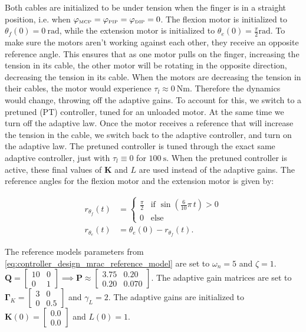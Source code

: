Both cables are initialized to be under tension when the finger is in a straight position, i.e. when $\varphi_{{\scriptscriptstyle\mathrm{MCP}}} = \varphi_{{\scriptscriptstyle\mathrm{PIP}}} = \varphi_{{\scriptscriptstyle\mathrm{DIP}}} = 0$. The flexion motor is initialized to $\theta_f(0) = \SI{0}{\radian}$, while the extension motor is initialized to $\theta_e(0) = \frac{\pi}{2}\si{\radian}$. To make sure the motors aren't working against each other, they receive an opposite reference angle. This ensures that as one motor pulls on the finger, increasing the tension in its cable, the other motor will be rotating in the opposite direction, decreasing the tension in its cable. When the motors are decreasing the tension in their cables, the motor would experience $\tau_l \approx \SI{0}{\newton\metre}$. Therefore the dynamics would change, throwing off the adaptive gains. To account for this, we switch to a pretuned (PT) controller, tuned for an unloaded motor. At the same time we turn off the adaptive law. Once the motor receives a reference that will increase the tension in the cable, we switch back to the adaptive controller, and turn on the adaptive law. The pretuned controller is tuned through the exact same adaptive controller, just with $\tau_l\equiv0$ for $\SI{100}{\second}$. When the pretuned controller is active, these final values of $\mathbf{K}$ and $L$ are used instead of the adaptive gains. The reference angles for the flexion motor and the extension motor is given by:

\begin{equation}
    \begin{aligned}
        r_{\theta_f}(t) &= \begin{cases}
            \frac{\pi}{2} & \text{if } \sin(\frac{6}{10}\pi\, t) > 0 \\
            0 & \text{else}
        \end{cases} \\
        r_{\theta_e}(t) &= \theta_e(0) - r_{\theta_f}(t).
    \end{aligned}
\end{equation}

The reference models parameters from \cref{eq:controller_design_mrac_reference_model} are set to $\omega_n = 5$ and $\zeta = 1$. $\mathbf{Q} = \begin{bmatrix}
    10 & 0 \\
    0 & 1
\end{bmatrix} \implies \mathbf{P} \approx \begin{bmatrix}
    3.75 & 0.20 \\
    0.20 & 0.070
\end{bmatrix}$. The adaptive gain matrices are set to $\boldsymbol{\Gamma}_K = \begin{bmatrix}
    3 & 0 \\
    0 & 0.5
\end{bmatrix}$ and $\gamma_L = 2$. The adaptive gains are initialized to $\mathbf{K}(0) = \begin{bmatrix}
    0.0 \\
    0.0
\end{bmatrix}$ and $L(0) = 1$.

